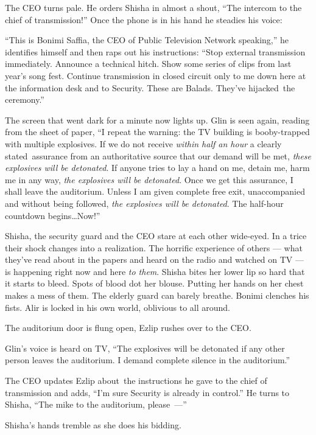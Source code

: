 \documentclass[twoside,11pt]{book}
\begin{document}
The CEO turns pale. He orders Shisha in almost a shout, ``The intercom to the
chief of transmission!'' Once the phone is in his hand he steadies his voice:

``This is Bonimi Saffia, the CEO of Public Television Network speaking,'' he identifies
himself and then raps out his instructions: ``Stop external transmission immediately. Announce a technical
hitch. Show some series of clips from last year's song fest. Continue transmission in closed circuit only to me down
here at the information desk and to Security. These are Balads. They've hijacked~the ceremony.''

The screen that went dark for a minute now lights up. Glin is seen again, reading from the sheet of paper,
``I repeat the warning: the TV building is booby-trapped with multiple explosives.  If we do not receive
\textit{within half an hour} a clearly stated~assurance from an authoritative source that our demand will be met,
\textit{these explosives will be detonated}. If anyone tries to lay a hand on me, detain me, harm me in any way,
\textit{the explosives will be detonated}. Once we get this assurance, I shall leave the auditorium. Unless I am given
complete free exit, unaccompanied and without{ }being followed, \textit{the
explosives will be detonated}. The half-hour countdown begins{\ldots}Now!''

Shisha, the security guard and the CEO stare at each other wide-eyed. In a trice their shock changes into a
realization. The horrific experience of others ---  what they've read about in the papers and heard on the radio and
watched on TV  --- is happening right now and here \textit{to them}. Shisha bites her lower lip so hard that it
starts to bleed. Spots of blood dot her blouse. Putting her hands on her chest makes a mess of them. The elderly
guard can barely breathe. Bonimi clenches his fists. Alir is locked in his own world, oblivious to all around.

The auditorium door is flung open, Ezlip rushes over to the CEO.

Glin's voice is heard on TV, ``The explosives will be detonated if any other person leaves the auditorium.
I demand complete silence in the auditorium.''

The CEO updates Ezlip about~the instructions he gave to the chief of transmission and adds, ``I'm sure
Security is already in control.'' He turns to Shisha, ``The mike to the auditorium, please~---''

Shisha's hands tremble as she does his bidding.
\end{document}
